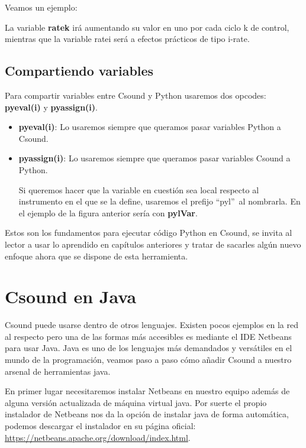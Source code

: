 Veamos un ejemplo:


La variable \textbf{ratek} irá aumentando su valor en uno por cada ciclo k de control, mientras que la variable ratei será a efectos prácticos de tipo i-rate.

\subsection{Compartiendo variables}

Para compartir variables entre Csound y Python usaremos dos opcodes: \textbf{pyeval(i)} y \textbf{pyassign(i)}.
\begin{itemize}
 \item \textbf{pyeval(i)}: Lo usaremos siempre que queramos pasar variables Python a Csound. 
 
 
 \item \textbf{pyassign(i)}: Lo usaremos siempre que queramos pasar variables Csound a Python. 
 

Si queremos hacer que la variable en cuestión sea local respecto al instrumento en el que se la define, usaremos el prefijo ``pyl''\ al nombrarla. En el ejemplo de la figura anterior sería con \textbf{pylVar}.
\end{itemize}

Estos son los fundamentos para ejecutar código Python en Csound, se invita al lector a usar lo aprendido en capítulos anteriores y tratar de sacarles algún nuevo enfoque ahora que se dispone de esta herramienta.
\pagebreak

\section{Csound en Java}

Csound puede usarse dentro de otros lenguajes. Existen pocos ejemplos en la red al respecto pero una de las formas más accesibles es mediante el IDE Netbeans para usar Java. Java es uno de los lenguajes más demandados y versátiles en el mundo de la programación, veamos paso a paso cómo añadir Csound a nuestro arsenal de herramientas java.
\bigskip


En primer lugar necesitaremos instalar Netbeans en nuestro equipo además de alguna versión actualizada de máquina virtual java. Por suerte el propio instalador de Netbeans nos da la opción de instalar java de forma automática, podemos descargar el instalador en su página oficial: \url{https://netbeans.apache.org/download/index.html}.

